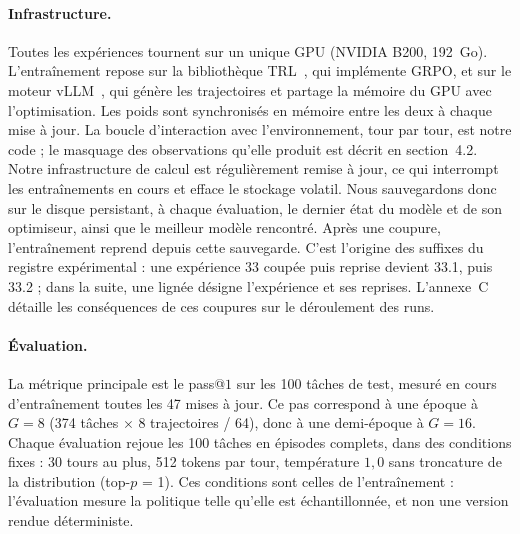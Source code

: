 \documentclass[11pt,a4paper]{article}
\begin{document}
\paragraph{Infrastructure.} Toutes les expériences tournent sur un unique GPU (NVIDIA B200, 192~Go). L'entraînement repose sur la bibliothèque TRL~\cite{vonwerra2020trl}, qui implémente GRPO, et sur le moteur vLLM~\cite{kwon2023vllm}, qui génère les trajectoires et partage la mémoire du GPU avec l'optimisation. Les poids sont synchronisés en mémoire entre les deux à chaque mise à jour. La boucle d'interaction avec l'environnement, tour par tour, est notre code ; le masquage des observations qu'elle produit est décrit en section~4.2. Notre infrastructure de calcul est régulièrement remise à jour, ce qui interrompt les entraînements en cours et efface le stockage volatil. Nous sauvegardons donc sur le disque persistant, à chaque évaluation, le dernier état du modèle et de son optimiseur, ainsi que le meilleur modèle rencontré. Après une coupure, l'entraînement reprend depuis cette sauvegarde. C'est l'origine des suffixes du registre expérimental : une expérience 33 coupée puis reprise devient 33.1, puis 33.2 ; dans la suite, une lignée désigne l'expérience et ses reprises. L'annexe~C détaille les conséquences de ces coupures sur le déroulement des runs.








\paragraph{Évaluation.} La métrique principale est le pass@$1$ sur les 100 tâches de test, mesuré en cours d'entraînement toutes les 47 mises à jour. Ce pas correspond à une époque à $G=8$ (374 tâches $\times$ 8 trajectoires / 64), donc à une demi-époque à $G=16$. Chaque évaluation rejoue les 100 tâches en épisodes complets, dans des conditions fixes : 30 tours au plus, 512 tokens par tour, température $1{,}0$ sans troncature de la distribution (top-$p$ = 1). Ces conditions sont celles de l'entraînement : l'évaluation mesure la politique telle qu'elle est échantillonnée, et non une version rendue déterministe.
\end{document}
